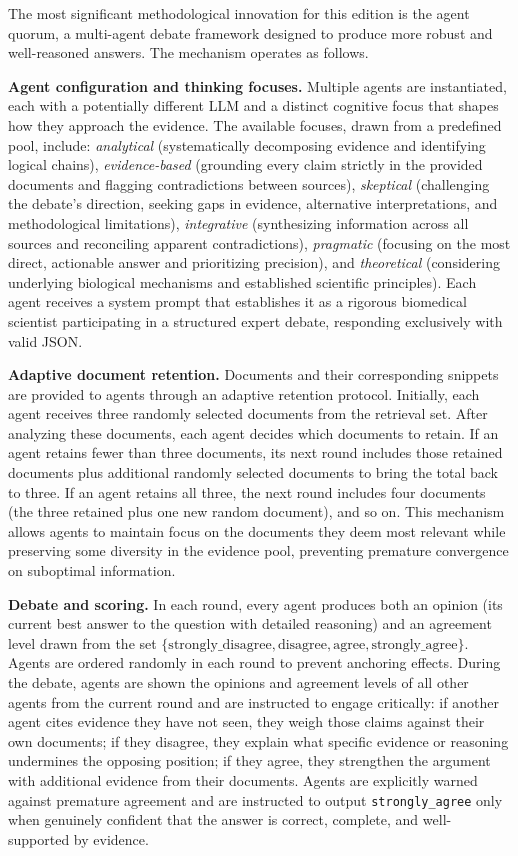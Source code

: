 The most significant methodological innovation for this edition is the agent quorum, a multi-agent debate framework designed to produce more robust and well-reasoned answers. The mechanism operates as follows.

\textbf{Agent configuration and thinking focuses.} Multiple agents are instantiated, each with a potentially different LLM and a distinct cognitive focus that shapes how they approach the evidence. The available focuses, drawn from a predefined pool, include: \emph{analytical} (systematically decomposing evidence and identifying logical chains), \emph{evidence-based} (grounding every claim strictly in the provided documents and flagging contradictions between sources), \emph{skeptical} (challenging the debate's direction, seeking gaps in evidence, alternative interpretations, and methodological limitations), \emph{integrative} (synthesizing information across all sources and reconciling apparent contradictions), \emph{pragmatic} (focusing on the most direct, actionable answer and prioritizing precision), and \emph{theoretical} (considering underlying biological mechanisms and established scientific principles). Each agent receives a system prompt that establishes it as a rigorous biomedical scientist participating in a structured expert debate, responding exclusively with valid JSON.

\textbf{Adaptive document retention.} Documents and their corresponding snippets are provided to agents through an adaptive retention protocol. Initially, each agent receives three randomly selected documents from the retrieval set. After analyzing these documents, each agent decides which documents to retain. If an agent retains fewer than three documents, its next round includes those retained documents plus additional randomly selected documents to bring the total back to three. If an agent retains all three, the next round includes four documents (the three retained plus one new random document), and so on. This mechanism allows agents to maintain focus on the documents they deem most relevant while preserving some diversity in the evidence pool, preventing premature convergence on suboptimal information.

\textbf{Debate and scoring.} In each round, every agent produces both an opinion (its current best answer to the question with detailed reasoning) and an agreement level drawn from the set $\{\text{strongly\_disagree}, \text{disagree}, \text{agree}, \text{strongly\_agree}\}$. Agents are ordered randomly in each round to prevent anchoring effects. During the debate, agents are shown the opinions and agreement levels of all other agents from the current round and are instructed to engage critically: if another agent cites evidence they have not seen, they weigh those claims against their own documents; if they disagree, they explain what specific evidence or reasoning undermines the opposing position; if they agree, they strengthen the argument with additional evidence from their documents. Agents are explicitly warned against premature agreement and are instructed to output \texttt{strongly\_agree} only when genuinely confident that the answer is correct, complete, and well-supported by evidence.

